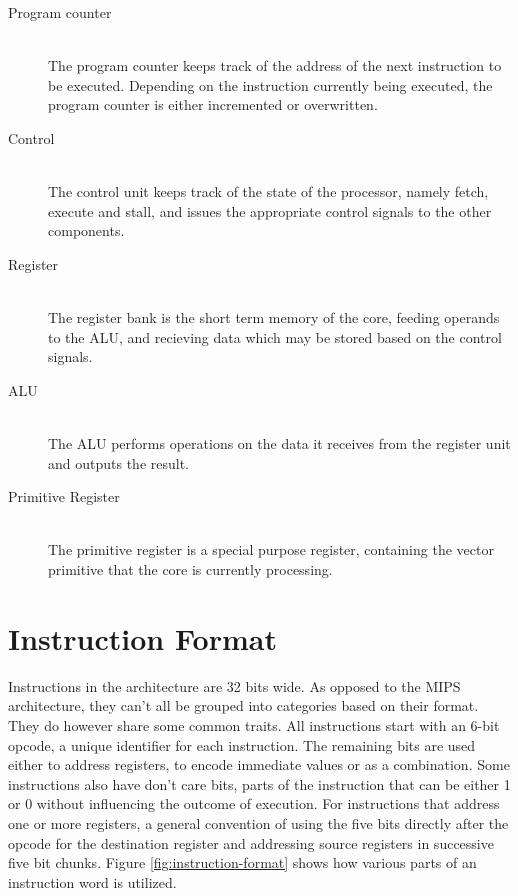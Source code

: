 \begin{description}
    \item[Program counter] \hfill \\
        The program counter keeps track of the address of the next instruction to be executed.
        Depending on the instruction currently being executed, the program counter is either incremented or overwritten.
    \item[Control] \hfill \\
        The control unit keeps track of the state of the processor, namely fetch, execute and stall, and issues the appropriate control signals to the other components.
    \item[Register] \hfill \\
        The register bank is the short term memory of the core, feeding operands to the ALU, and recieving data which may be stored based on the control signals.
    \item[ALU] \hfill \\
        The ALU performs operations on the data it receives from the register unit and outputs the result.
    \item[Primitive Register] \hfill \\
        The primitive register is a special purpose register, containing the vector primitive that the core is currently processing.
\end{description}

\section{Instruction Format}

Instructions in the \vthreek architecture are 32 bits wide.
As opposed to the MIPS architecture, they can't all be grouped into categories based on their format.
They do however share some common traits.
All instructions start with an 6-bit opcode, a unique identifier for each instruction.
The remaining bits are used either to address registers, to encode immediate values or as a combination.
Some instructions also have don't care bits, parts of the instruction that can be either 1 or 0 without influencing the outcome of execution.
For instructions that address one or more registers, a general convention of using the five bits directly after the opcode for the destination register and addressing source registers in successive five bit chunks.
Figure \ref{fig:instruction-format} shows how various parts of an instruction word is utilized.

